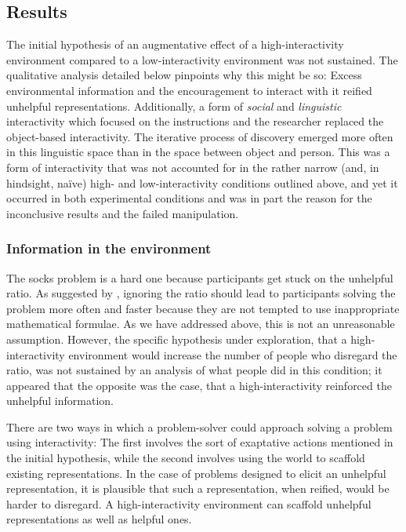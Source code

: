 \documentclass[twocolumn, serif, empirical, authordate]{jote-article}
\begin{document}
\subsection*{Results}

The initial hypothesis of an augmentative effect of a high-interactivity environment compared to a low-interactivity environment was not sustained. The qualitative analysis detailed below pinpoints why this might be so: Excess environmental information and the encouragement to interact with it reified unhelpful representations. Additionally, a form of \emph{social} and \emph{linguistic} interactivity which focused on the instructions and the researcher replaced the object-based interactivity. The iterative process of discovery emerged more often in this linguistic space than in the space between object and person. This was a form of interactivity that was not accounted for in the rather narrow (and, in hindsight, naïve) high- and low-interactivity conditions outlined above, and yet it occurred in both experimental conditions and was in part the reason for the inconclusive results and the failed manipulation. 

\subsubsection*{Information in the environment}

The socks problem is a hard one because participants get stuck on the unhelpful ratio. As suggested by \textcite{Vallee-Tourangeau2020}, ignoring the ratio should lead to participants solving the problem more often and faster because they are not tempted to use inappropriate mathematical formulae. As we have addressed above, this is not an unreasonable assumption. However, the specific hypothesis under exploration, that a high-interactivity environment would increase the number of people who disregard the ratio, was not sustained by an analysis of what people did in this condition; it appeared that the opposite was the case, that a high-interactivity reinforced the unhelpful information. 

There are two ways in which a problem-solver could approach solving a problem using interactivity: The first involves the sort of exaptative actions mentioned in the initial hypothesis, while the second involves using the world to scaffold existing representations. In the case of problems designed to elicit an unhelpful representation, it is plausible that such a representation, when reified, would be harder to disregard. A high-interactivity environment can scaffold unhelpful representations as well as helpful ones. 
\end{document}
